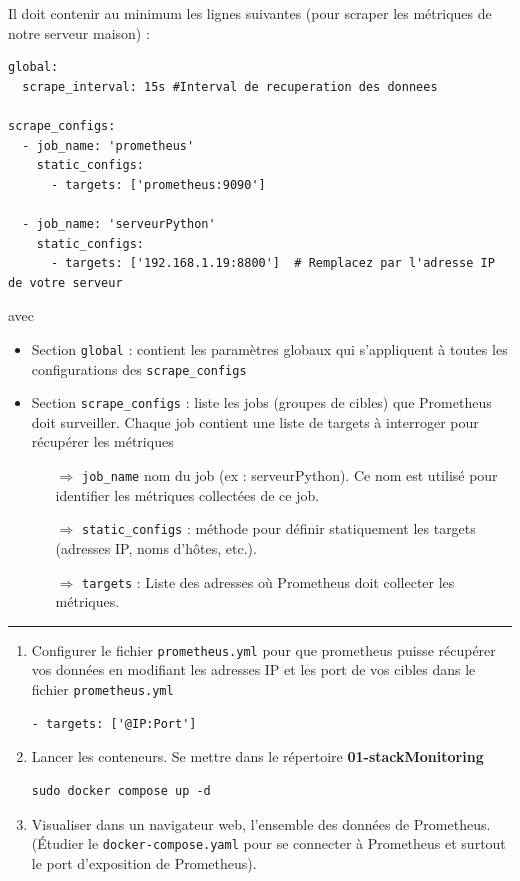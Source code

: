 \documentclass[french, 12pt]{article}%
\newcommand{\itemE}{\item[$\bullet$]}
\begin{document}
Il doit contenir au minimum les lignes suivantes (pour scraper les métriques de notre serveur maison) : 
\begin{lstlisting}[style=commande]
global:
  scrape_interval: 15s #Interval de recuperation des donnees
  
scrape_configs:
  - job_name: 'prometheus'
    static_configs:
      - targets: ['prometheus:9090']
      
  - job_name: 'serveurPython'
    static_configs:
      - targets: ['192.168.1.19:8800']  # Remplacez par l'adresse IP de votre serveur
\end{lstlisting}
avec
\begin{itemize}
\itemE Section \verb?global? : contient les paramètres globaux qui s'appliquent à toutes les configurations des \verb?scrape_configs?
\itemE Section \verb?scrape_configs? : liste les jobs (groupes de cibles) que Prometheus doit surveiller. Chaque job contient une liste de targets à interroger pour récupérer les métriques
	\begin{itemize}
	\item[$\Rightarrow$] \verb?job_name? nom du job (ex : serveurPython). Ce nom est utilisé pour identifier les métriques collectées de ce job.
	\item[$\Rightarrow$] \verb?static_configs?	: méthode pour définir statiquement les targets (adresses IP, noms d'hôtes, etc.).
	\item[$\Rightarrow$] \verb?targets?	: Liste des adresses où Prometheus doit collecter les métriques.
	\end{itemize}
\end{itemize}


\begin{center}
 \rule{0.75\linewidth}{1pt}
 \end{center}

\begin{enumerate}[resume]
\item Configurer le fichier \verb?prometheus.yml? pour que prometheus puisse récupérer vos données en modifiant les adresses IP et les port de vos cibles dans le fichier \verb?prometheus.yml?
\begin{lstlisting}[style=commande]
  - targets: ['@IP:Port'] 
\end{lstlisting} 


\item Lancer les conteneurs. Se mettre dans le répertoire \textbf{01-stackMonitoring}
\begin{lstlisting}[style=commande]
 sudo docker compose up -d
\end{lstlisting} 

\item Visualiser dans un navigateur web, l'ensemble des données de Prometheus. (Étudier le \verb?docker-compose.yaml? pour se connecter à Prometheus et surtout le port d'exposition de Prometheus).
\end{enumerate}
\end{document}
